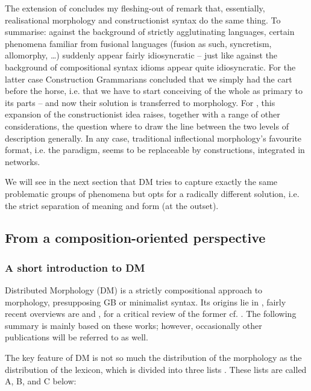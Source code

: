 \documentclass[output=paper]{langsci/langscibook}
\begin{document}
The extension of \citet{Booij2010} concludes my fleshing-out of  remark that, essentially, realisational morphology and constructionist syntax do the same thing. To summarise: against the background of strictly agglutinating languages, certain phenomena familiar from fusional languages (fusion as such, syncretism, allomorphy, …) suddenly appear fairly idiosyncratic – just like against the background of compositional syntax idioms appear quite idiosyncratic. For the latter case Construction Grammarians concluded that we simply had the cart before the horse, i.e. that we have to start conceiving of the whole as primary to its parts – and now their solution is transferred to morphology. For \citet{Haspelmath2011}, this expansion of the constructionist idea raises, together with a range of other considerations, the question where to draw the line between the two levels of description generally. In any case, traditional inflectional morphology’s favourite format, i.e. the paradigm, seems to be replaceable by constructions, integrated in networks.

We will see in the next section that DM tries to capture exactly the same problematic groups of phenomena but opts for a radically different solution, i.e. the strict separation of meaning and form (at the outset).


\subsection{From a composition-oriented perspective} \label{reiner:2.2}

\subsubsection{A short introduction to DM} \label{reiner:2.2.1}


Distributed Morphology (DM) is a strictly compositional approach to morphology, presupposing GB or minimalist syntax. Its origins lie in \citet{HalleHalle1993}, fairly recent overviews are \citet{Embick2015} and \citet{Bobaljik2017}, for a critical review of the former cf. \citet{Spencer2019}. The following summary is mainly based on these works; however, occasionally other publications will be referred to as well.

The key feature of DM is not so much the distribution of the morphology as the distribution of the lexicon, which is divided into three lists \citep[28]{Bobaljik2017}. These lists are called A, B, and C below:
\end{document}
